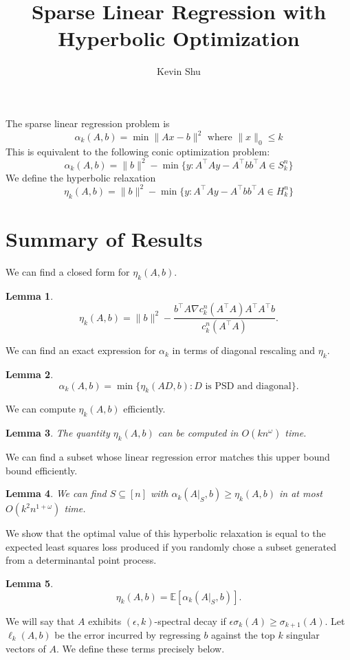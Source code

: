 \documentclass[a4paper]{article}
\author{Kevin Shu}
\title{Sparse Linear Regression with Hyperbolic Optimization}
\newtheorem{lemma}{Lemma}
\newcommand{\E}{\mathbb{E}}
\begin{document}
The sparse linear regression problem is
\[
    \alpha_k(A, b) = \min \|A x - b\|^2 \text{ where }\|x\|_0 \le k
\]
This is equivalent to the following conic optimization problem:
\begin{equation}\label{eq:tight}
    \alpha_k(A, b) = 
    \|b\|^2 - \min \{y : A^{\intercal}A y - A^{\intercal}bb^{\intercal}A \in S^{n}_k\}
\end{equation}
We define the hyperbolic relaxation
\begin{equation}\label{eq:relax}
    \eta_k(A, b) = 
    \|b\|^2 - \min \{y : A^{\intercal}A y - A^{\intercal}bb^{\intercal}A \in H^{n}_k\}
\end{equation}
\section{Summary of Results}
We can find a closed form for $\eta_k(A,b)$.
\begin{lemma}
    \[
        \eta_k(A, b) = \|b\|^2 - \frac{b^{\intercal} A\nabla c_k^n(A^{\intercal}A)A^{\intercal} A^{\intercal}b}{c_k^n(A^{\intercal}A)}.
    \]
\end{lemma}

We can find an exact expression for $\alpha_k$ in terms of diagonal rescaling and $\eta_k$.
\begin{lemma}
\[\alpha_k(A, b) =  \min \{ \eta_k(AD, b) : {D \text{ is PSD and diagonal}}\}.\]
\end{lemma}

We can compute $\eta_k(A,b)$ efficiently.
\begin{lemma}
    The quantity $\eta_k(A, b)$ can be computed in $O(kn^{\omega})$ time.
\end{lemma}

We can find a subset whose linear regression error matches this upper bound bound efficiently.
\begin{lemma}
    We can find $S \subseteq [n]$ with $\alpha_k(A|_S, b) \ge \eta_k(A, b)$ in at most $O(k^2n^{1+\omega})$ time.
\end{lemma}

We show that the optimal value of this hyperbolic relaxation is equal to the expected least squares loss produced if you randomly chose a subset generated from a determinantal point process.
\begin{lemma}
    \[
        \eta_k(A, b) = \E[\alpha_k(A|_S, b)].
    \]
\end{lemma}

We will say that $A$ exhibits $(\epsilon, k)$-spectral decay if $\epsilon \sigma_{k}(A) \ge \sigma_{k+1}(A)$.
Let $\ell_k(A,b)$ be the error incurred by regressing $b$ against the top $k$ singular vectors of $A$. We define these terms precisely below.
\end{document}
